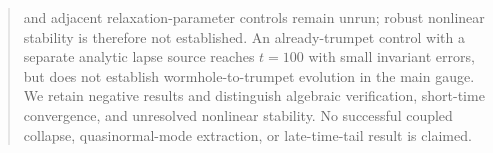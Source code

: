 \documentclass[aps,prd,reprint,floatfix,nofootinbib,longbibliography]{revtex4-2}
\begin{document}
\begin{abstract}
and adjacent relaxation-parameter controls remain unrun; robust nonlinear stability is therefore not established. An already-trumpet control with a separate analytic lapse source reaches $t=100$ with small invariant errors, but does not establish wormhole-to-trumpet evolution in the main gauge. We retain negative results and distinguish algebraic verification, short-time convergence, and unresolved nonlinear stability. No successful coupled collapse, quasinormal-mode extraction, or late-time-tail result is claimed.
\end{abstract}
\maketitle





\appendix




\end{document}
